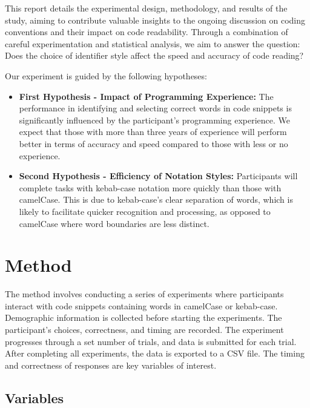\documentclass{article}
\begin{document}
This report details the experimental design, methodology, and results of the study, aiming to contribute valuable insights to the ongoing discussion on coding conventions and their impact on code readability. Through a combination of careful experimentation and statistical analysis, we aim to answer the question: Does the choice of identifier style affect the speed and accuracy of code reading?



\begin{tcolorbox}[title=Hypotheses]
    Our experiment is guided by the following hypotheses:
    \begin{itemize}
        \item \textbf{First Hypothesis - Impact of Programming Experience:} The performance in identifying and selecting correct words in code snippets is significantly influenced by the participant's programming experience. We expect that those with more than three years of experience will perform better in terms of accuracy and speed compared to those with less or no experience.

        \item \textbf{Second Hypothesis - Efficiency of Notation Styles:} Participants will complete tasks with kebab-case notation more quickly than those with camelCase. This is due to kebab-case's clear separation of words, which is likely to facilitate quicker recognition and processing, as opposed to camelCase where word boundaries are less distinct.
    \end{itemize}
\end{tcolorbox}




\section{Method}
The method involves conducting a series of experiments where participants interact with code snippets containing words in camelCase or kebab-case. Demographic information is collected before starting the experiments. The participant's choices, correctness, and timing are recorded. The experiment progresses through a set number of trials, and data is submitted for each trial. After completing all experiments, the data is exported to a CSV file. The timing and correctness of responses are key variables of interest.
\subsection{Variables}
\end{document}
